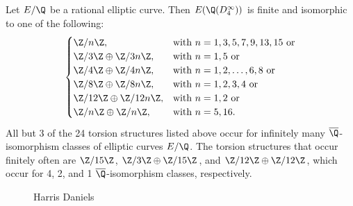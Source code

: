\begin{frame}[plain]
\footnotesize
\begin{thm}[Daniels, 2017]
Let $E/\Q$ be a rational elliptic curve. Then $E(\Q(D_4^\infty))$ is finite and isomorphic to one of the following:
	\[
	\begin{cases}
	\Z/n\Z, & \text{with } n= 1, 3, 5, 7, 9, 13, 15 \text{ or} \\
	\Z/3\Z \oplus \Z/3n\Z, & \text{with } n= 1, 5 \text{ or} \\
	\Z/4\Z \oplus \Z/4n\Z, & \text{with } n= 1, 2, \ldots, 6, 8 \text{ or} \\
	\Z/8\Z \oplus \Z/8n\Z, & \text{with } n= 1, 2, 3, 4 \text{ or} \\
	\Z/12\Z \oplus \Z/12n\Z, & \text{with } n= 1, 2 \text{ or} \\
	\Z/n\Z \oplus \Z/n\Z, & \text{with } n= 5, 16.
	\end{cases}
	\]
All but 3 of the 24 torsion structures listed above occur for infinitely many $\overline{\Q}$-isomorphism classes of elliptic curves $E/\Q$. The torsion structures that occur finitely often are $\Z/15\Z$, $\Z/3\Z \oplus \Z/15\Z$, and $\Z/12\Z \oplus \Z/12\Z$, which occur for 4, 2, and 1 $\overline{\Q}$-isomorphism classes, respectively. 
\end{thm}
	\begin{figure}[!ht]
	\centering
	\captionsetup{labelformat=empty}
	\caption{\scriptsize Harris Daniels}
	\end{figure}
\end{frame}




